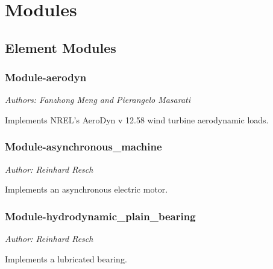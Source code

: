 %
%
%
%
%
% 
%
%

\chapter{Modules}

\section{Element Modules}

\subsection{Module-aerodyn}
\emph{Authors: Fanzhong Meng and Pierangelo Masarati}

\noindent
Implements NREL's AeroDyn v 12.58 wind turbine aerodynamic loads.

\subsection{Module-asynchronous\_machine}
\emph{Author: Reinhard Resch}

\noindent
Implements an asynchronous electric motor.

\subsection{Module-hydrodynamic\_plain\_bearing}
\emph{Author: Reinhard Resch}

\noindent
Implements a lubricated bearing.

